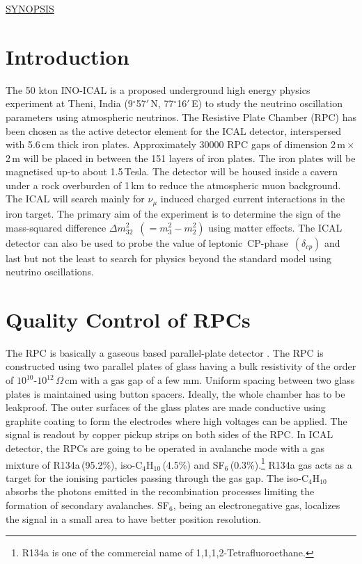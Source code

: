 \begin{center}
  \vspace*{0.5em}
  \large
  \underline{SYNOPSIS}
\end{center}

\normalsize

\doublespacing

\section*{Introduction}
The 50 kton INO-ICAL \cite{inowhite} is a proposed underground high
energy physics experiment at Theni, India (9$^\circ$57$'$\,N,
77$^\circ$16$'$\,E) to study the neutrino oscillation parameters using
atmospheric neutrinos. The Resistive Plate Chamber (RPC) has been
chosen as the active detector element for the ICAL detector,
interspersed with 5.6\,cm thick iron plates. Approximately 30000 RPC
gaps of dimension 2\,m\,$\times$\,2\,m will be placed in between the
151 layers of iron plates. The iron plates will be magnetised up-to
about 1.5\,Tesla. The detector will be housed inside a cavern under a
rock overburden of 1\,km to reduce the atmospheric muon background.
The ICAL will search mainly for $\nu_{\mu}$ induced charged current
interactions in the iron target. The primary aim of the experiment is
to determine the sign of the mass-squared difference
\mbox{$\Delta m^2_{32}$ $\left(=m^2_3-m^2_2\right)$} using matter
effects. The ICAL detector can also be used to probe the value of
\mbox{leptonic CP-phase $\left(\delta_{cp}\right)$} and last but not
the least to search for physics beyond the standard model using
neutrino oscillations. 

\section*{Quality Control of RPCs}

The RPC is basically a gaseous based parallel-plate detector
\cite{rpc_p2}. The RPC is constructed using two parallel plates of
glass having a bulk resistivity of the order of
$10^{10}$-$10^{12}$\,$\Omega$\,cm with a gas gap of a few mm. Uniform
spacing between two glass plates is maintained using button spacers.
Ideally, the whole chamber has to be leakproof. The outer surfaces of
the glass plates are made conductive using graphite coating to form
the electrodes where high voltages can be applied. The signal is
readout by copper pickup strips on both sides of the RPC. In ICAL
detector, the RPCs are going to be operated in avalanche mode with
a gas mixture of R134a\,(95.2\%), iso-C$_4$H$_{10}$\,(4.5\%) and
SF$_6$\,(0.3\%).\footnote{R134a is one of the commercial name of 1,1,1,2-Tetrafluoroethane.}
R134a gas acts as a target for the ionising particles passing through
the gas gap. The iso-C$_4$H$_{10}$ absorbs the photons emitted in the
recombination processes limiting the formation of secondary
avalanches. SF$_6$, being an electronegative gas, localizes the signal
in a small area to have better position resolution.

